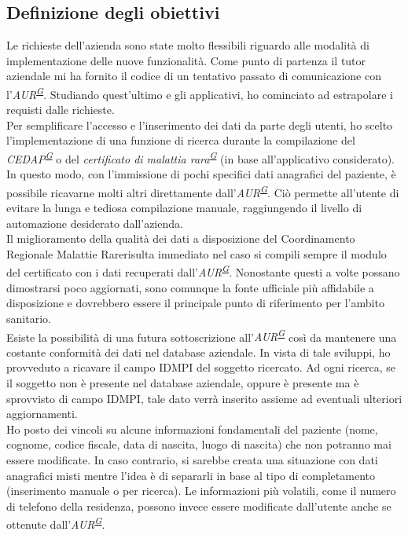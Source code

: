 \documentclass[a4paper]{article}
\newcommand{\crmr}{Coordinamento Regionale Malattie Rare}
\begin{document}
\subsection{Definizione degli obiettivi}
Le richieste dell'azienda sono state molto flessibili riguardo alle modalità di implementazione delle nuove funzionalità. Come punto di partenza il tutor aziendale mi ha fornito il codice di un tentativo passato di comunicazione con l'\textit{AUR\textsuperscript{\hyperref[sec:gl]{G}}}. Studiando quest'ultimo e gli applicativi, ho cominciato ad estrapolare i requisti dalle richieste.
\\
Per semplificare l'accesso e l'inserimento dei dati da parte degli utenti, ho scelto l'implementazione di una funzione di ricerca durante la compilazione del \textit{CEDAP\textsuperscript{\hyperref[sec:gl]{G}}} o del \textit{certificato di malattia rara\textsuperscript{\hyperref[sec:gl]{G}}} (in base all'applicativo considerato). In questo modo, con l'immissione di pochi specifici dati anagrafici del paziente, è possibile ricavarne molti altri direttamente dall'\textit{AUR\textsuperscript{\hyperref[sec:gl]{G}}}. Ciò permette all'utente di evitare la lunga e tediosa compilazione manuale, raggiungendo il livello di automazione desiderato dall'azienda.
\\
Il miglioramento della qualità dei dati a disposizione del \crmr risulta immediato nel caso si compili sempre il modulo del certificato con i dati recuperati dall'\textit{AUR\textsuperscript{\hyperref[sec:gl]{G}}}. Nonostante questi a volte possano dimostrarsi poco aggiornati, sono comunque la fonte ufficiale più affidabile a disposizione e dovrebbero essere il principale punto di riferimento per l'ambito sanitario. 
\\
Esiste la possibilità di una futura sottoscrizione all'\textit{AUR\textsuperscript{\hyperref[sec:gl]{G}}} così da mantenere una costante conformità dei dati nel database aziendale. In vista di tale sviluppi, ho provveduto a ricavare il campo IDMPI del soggetto ricercato. Ad ogni ricerca, se il soggetto non è presente nel database aziendale, oppure è presente ma è sprovvisto di campo IDMPI, tale dato verrà inserito assieme ad eventuali ulteriori aggiornamenti.
\\
Ho posto dei vincoli su alcune informazioni fondamentali del paziente (nome, cognome, codice fiscale, data di nascita, luogo di nascita) che non potranno mai essere modificate. In caso contrario, si sarebbe creata una situazione con dati anagrafici misti mentre l'idea è di separarli in base al tipo di completamento (inserimento manuale o per ricerca). Le informazioni più volatili, come il numero di telefono della residenza, possono invece essere modificate dall'utente anche se ottenute dall'\textit{AUR\textsuperscript{\hyperref[sec:gl]{G}}}.
\end{document}
